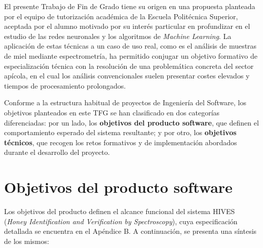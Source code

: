 
El presente Trabajo de Fin de Grado tiene su origen en una propuesta planteada
por el equipo de tutorización académica de la Escuela Politécnica Superior,
aceptada por el alumno motivado por su interés particular en profundizar en el
estudio de las redes neuronales y los algoritmos de \textit{Machine Learning}.
La aplicación de estas técnicas a un caso de uso real, como es el análisis de
muestras de miel mediante espectrometría, ha permitido conjugar un objetivo
formativo de especialización técnica con la resolución de una problemática
concreta del sector apícola, en el cual los análisis convencionales suelen
presentar costes elevados y tiempos de procesamiento prolongados.

Conforme a la estructura habitual de proyectos de Ingeniería del Software, los
objetivos planteados en este TFG se han clasificado en dos categorías
diferenciadas: por un lado, los \textbf{objetivos del producto software}, que
definen el comportamiento esperado del sistema resultante; y por otro, los
\textbf{objetivos técnicos}, que recogen los retos formativos y de
implementación abordados durante el desarrollo del proyecto.

\section{Objetivos del producto software}

Los objetivos del producto definen el alcance funcional del sistema HIVES
(\textit{Honey Identification and Verification by Spectroscopy}), cuya
especificación detallada se encuentra en el Apéndice B. A continuación,
se presenta una síntesis de los mismos:

